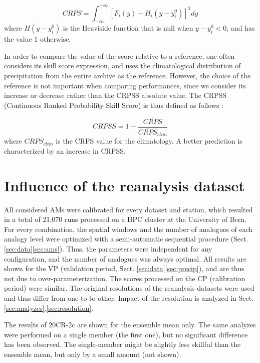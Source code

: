 \documentclass{ametsoc}
\begin{document}
\begin{equation}
\label{eq:CRPS}
CRPS = \int_{-\infty}^{+\infty} \left[ F_{i}(y)-H_{i}(y-y_{i}^{0})\right]^{2} dy
\end{equation}
where $H(y-y_{i}^{0})$ is the Heaviside function that is null when $y-y_{i}^{0}<0$, and has the value 1 otherwise.

In order to compare the value of the score relative to a reference, one often considers its skill score expression, and uses the climatological distribution of precipitation from the entire archive as the reference. However, the choice of the reference is not important when comparing performances, since we consider its increase or decrease rather than the CRPSS absolute value. The CRPSS (Continuous Ranked Probability Skill Score) is thus defined as follows \citep{Bradley2011}:

\begin{equation}
\label{eq:CRPSS}
CRPSS = 1-\frac{\overline{CRPS}}{\overline{CRPS}_{clim}}
\end{equation}
where $CRPS_{clim}$ is the CRPS value for the climatology. A better prediction is characterized by an increase in CRPSS.



\section{Influence of the reanalysis dataset}
\label{sec:influence}

All considered AMs were calibrated for every dataset and station, which resulted in a total of 21,070 runs processed on a HPC cluster at the University of Bern. For every combination, the spatial windows and the number of analogues of each analogy level were optimized with a semi-automatic sequential procedure (Sect. \ref{sec:data}\ref{sec:ams}). Thus, the parameters were independent for any configuration, and the number of analogues was always optimal. All results are shown for the VP (validation period, Sect. \ref{sec:data}\ref{sec:precip}), and are thus not due to over-parameterization. The scores processed on the CP (calibration period) were similar. The original resolutions of the reanalysis datasets were used and thus differ from one to to other. Impact of the resolution is analyzed in Sect. \ref{sec:analyzes}.\ref{sec:resolution}.

The results of 20CR-2c are shown for the ensemble mean only. The same analyzes were performed on a single member (the first one), but no significant difference has been observed. The single-member might be slightly less skillful than the ensemble mean, but only by a small amount (not shown).
\end{document}
